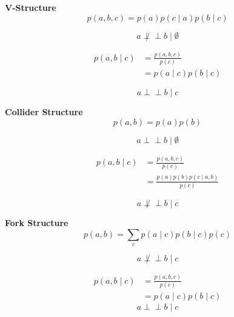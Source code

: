 \documentclass{article}
\def\ci{\perp\!\!\!\perp}
\begin{document}
\newpage
\begin{multicols}{3}       %
    \textbf{V-Structure}
    \begin{equation}
        p(a, b, c)=p(a) p(c \mid a) p(b \mid c)
    \end{equation}
    
    \begin{equation}
        a \not \ci b \mid \emptyset
    \end{equation}
    
    \begin{equation}
        \begin{aligned}
        p(a, b \mid c) &=\frac{p(a, b, c)}{p(c)} \\
        &=p(a \mid c) p(b \mid c)
        \end{aligned}
    \end{equation}
    
    \begin{equation}
        a  \ci b \mid c
    \end{equation}
    
    \textbf{Collider Structure}
    \begin{equation}
        p(a, b)=p(a) p(b)
    \end{equation}
    
    \begin{equation}
        a \ci b \mid \emptyset
    \end{equation}
    
    \begin{equation}
        \begin{aligned}
        p(a, b \mid c) &=\frac{p(a, b, c)}{p(c)} \\
        &=\frac{p(a) p(b) p(c \mid a, b)}{p(c)}
        \end{aligned}
    \end{equation}
    
    \begin{equation}
        a \not \ci b \mid c
    \end{equation}
    
    \textbf{Fork Structure}
    \begin{equation}
        p(a, b)=\sum_{c} p(a \mid c) p(b \mid c) p(c)
    \end{equation}
    
    \begin{equation}
        a \not \ci b \mid c
    \end{equation}
    
    
    \begin{equation}
        \begin{aligned}
        p(a, b \mid c) &=\frac{p(a, b, c)}{p(c)} \\
        &=p(a \mid c) p(b \mid c)
        \end{aligned}
    \end{equation}
    \begin{equation}
        a \ci b \mid c
    \end{equation}
\end{multicols}
\end{document}
